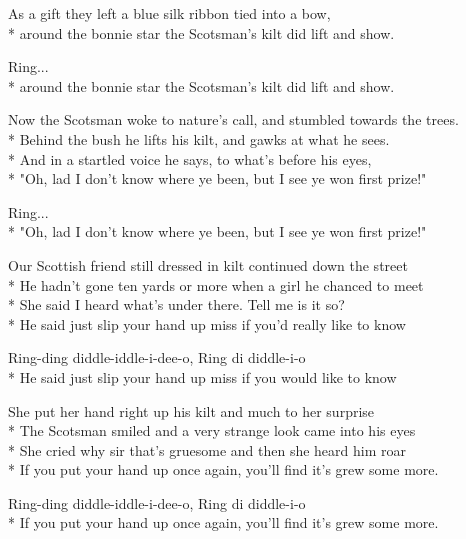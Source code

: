\begin{SongText}
\begin{SongVerse}
        As a gift they left a blue silk ribbon tied into a bow,\\*%
        around the bonnie star the Scotsman's kilt did lift and show.
    \end{SongVerse}
    \begin{SongVerse}
        Ring...\\*%
        around the bonnie star the Scotsman's kilt did lift and show.
    \end{SongVerse}
    \begin{SongVerse}
        Now the Scotsman woke to nature's call, and stumbled towards the trees.\\*%
        Behind the bush he lifts his kilt, and gawks at what he sees.\\*%
        And in a startled voice he says, to what's before his eyes,\\*%
        "Oh, lad I don't know where ye been, but I see ye won first prize!"
    \end{SongVerse}
    \begin{SongVerse}
        Ring...\\*%
        "Oh, lad I don't know where ye been, but I see ye won first prize!"
    \end{SongVerse}
    \begin{SongVerse}
        Our Scottish friend still dressed in kilt continued down the street\\*%
        He hadn't gone ten yards or more when a girl he chanced to meet\\*%
        She said I heard what's under there. Tell me is it so?\\*%
        He said just slip your hand up miss if you'd really like to know
    \end{SongVerse}
    \begin{SongVerse}
        Ring-ding diddle-iddle-i-dee-o, Ring di diddle-i-o\\*%
        He said just slip your hand up miss if you would like to know
    \end{SongVerse}
    \begin{SongVerse}
        She put her hand right up his kilt and much to her surprise\\*%
        The Scotsman smiled and a very strange look came into his eyes\\*%
        She cried why sir that’s gruesome and then she heard him roar\\*%
        If you put your hand up once again, you'll find it's grew some more.
    \end{SongVerse}
    \begin{SongVerse}
        Ring-ding diddle-iddle-i-dee-o, Ring di diddle-i-o\\*%
        If you put your hand up once again, you'll find it's grew some more.
    \end{SongVerse}
\end{SongText}
